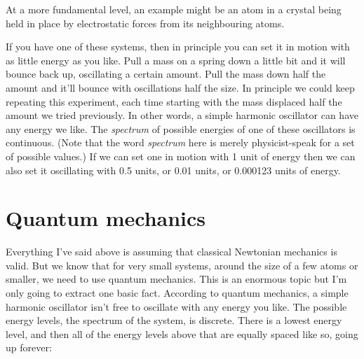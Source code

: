 \documentclass[a4paper]{article}
\begin{document}
\begin{center}
\end{center}

At a more fundamental level, an example might be an atom in a crystal being held in place by electrostatic forces from its neighbouring atoms.

If you have one of these systems, then in principle you can set it in motion with as little energy as you like.
Pull a mass on a spring down a little bit and it will bounce back up, oscillating a certain amount.
Pull the mass down half the amount and it'll bounce with oscillations half the size.
In principle we could keep repeating this experiment, each time starting with the mass displaced half the amount we tried previously.
In other words, a simple harmonic oscillator can have any energy we like.
The {\em spectrum} of possible energies of one of these oscillators is continuous.
(Note that the word {\em spectrum} here is merely physicist-speak for a set of possible values.)
If we can set one in motion with 1 unit of energy then we can also set it oscillating with 0.5 units, or 0.01 units, or 0.000123 units of energy.

\section{Quantum mechanics}

Everything I've said above is assuming that classical Newtonian mechanics is valid.
But we know that for very small systems, around the size of a few atoms or smaller, we need to use quantum mechanics.
This is an enormous topic but I'm only going to extract one basic fact.
According to quantum mechanics, a simple harmonic oscillator isn't free to oscillate with any energy you like.
The possible energy levels, the spectrum of the system, is discrete.
There is a lowest energy level, and then all of the energy levels above that are equally spaced like so, going up forever:
\end{document}
